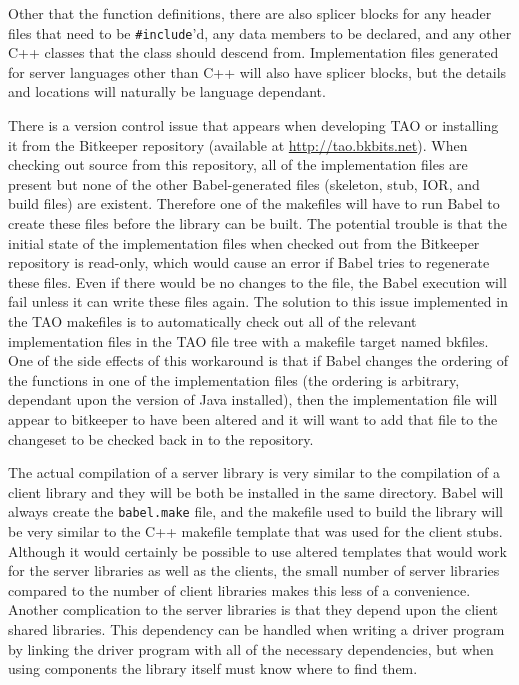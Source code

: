 \documentclass[doublespacing,12pt]{article}
\begin{document}
Other that the function definitions, there are also splicer blocks for any 
header files that need to be \texttt{\#include}'d, any data members to be
declared, and any other C++ classes that the class should descend from.
Implementation files generated for server languages other than C++
will also have 
splicer blocks, but the details and locations will naturally be language
dependant.

There is a version control issue that appears when developing TAO or
installing it from
the Bit\-keeper\cite{bitkeeper} repository (available at \url{http://tao.bkbits.net}).  When checking
out source from this repository, all of the implementation files are
present but none of the other Babel-generated files (skeleton, stub, 
IOR, and build files) are existent.  Therefore one of the makefiles will have
to run Babel
to create these files before the library can be built.  The potential trouble
is that the initial state of the implementation files when checked out
from the Bitkeeper repository is read-only,
which would cause an
error if Babel tries to regenerate these files.  Even if there would be no 
changes to the file, the Babel execution will fail unless it can write these
files again.  The solution to this issue implemented in the TAO makefiles is 
to automatically check out all of the relevant implementation files in
the TAO file tree
with a makefile target named \textsf{bkfiles}.  One of the side effects of this 
workaround is that if Babel changes the ordering of the functions in one of the
implementation files (the ordering is arbitrary, dependant upon the
version of Java 
installed), then the implementation file will appear to bitkeeper to
have been altered
and it will want to add that file to the changeset to be checked back in to the
repository.  

The actual compilation of a server library is very similar to the compilation 
of a client library and they will be both be installed in the same directory.
Babel will always create the \texttt{babel.make} file, 
and the makefile used to build the library will be very similar to the C++ 
makefile template that was used for the client stubs.  Although it would 
certainly be possible to use altered templates that would work for the server
libraries as well as the clients, the small number of server libraries compared
to the number of client libraries makes this less of a convenience.  Another
complication to the server libraries is that they depend upon the
client shared libraries.  This dependency can be handled when writing
a driver program by linking the driver program with all of the
necessary dependencies, but when using components the library itself must
know where to find them.
\end{document}
